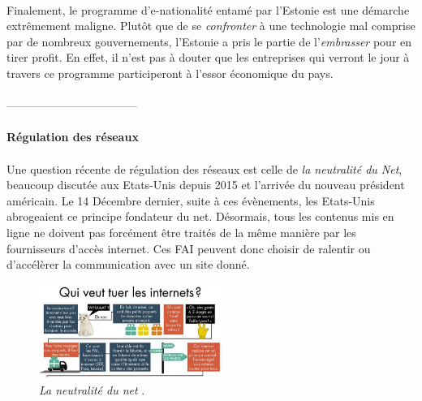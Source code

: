 \paragraph{} Finalement, le programme d'e-nationalité entamé par l'Estonie est une démarche extrêmement maligne. Plutôt
que de se \emph{confronter} à une technologie mal comprise par de nombreux gouvernements, l'Estonie a pris le partie de
l'\emph{embrasser} pour en tirer profit. En effet, il n'est pas à douter que les entreprises qui verront le jour à travers
ce programme participeront à l'essor économique du pays.


\paragraph{} -----------------------------------

\paragraph{Régulation des réseaux}

\paragraph{} Une question récente de régulation des réseaux est celle de \emph{la neutralité du Net},
beaucoup discutée aux Etats-Unis depuis 2015 et l'arrivée du nouveau président américain. Le 14 Décembre
dernier, suite à ces évènements, les Etats-Unis abrogeaient ce principe fondateur du net. \cite{NetNeutrality0}
Désormais, tous les contenus mis en ligne ne doivent pas forcément être traités de la même manière par
les fournisseurs d'accès internet. Ces FAI peuvent donc choisir de ralentir ou d'accélèrer la communication
avec un site donné.

\begin{figure}[ht]
    \centering
    \includegraphics[width=225px]{chapters/02/images/internet_cats.jpg}
    \caption{\label{netneutrality}\emph{La neutralité du net} \cite{NetNeutrality1}.}
\end{figure}

